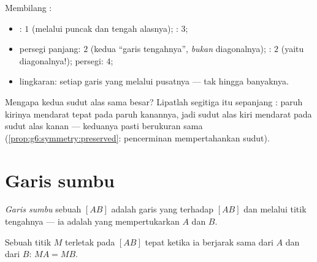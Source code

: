 \begin{example}\label{ex:g6:symmetry:shapes}
Membilang :
\begin{itemize}
  \item {}: $1$ (melalui  puncak dan
        tengah alasnya); : $3$;
  \item persegi panjang: $2$ (kedua ``garis tengahnya'', \emph{bukan}
        diagonalnya); : $2$ (yaitu diagonalnya!); persegi: $4$;
  \item lingkaran: setiap garis yang melalui pusatnya --- tak hingga banyaknya.
\end{itemize}
\end{example}

\begin{example}\label{ex:g6:symmetry:proves}
Mengapa kedua sudut alas  sama besar? Lipatlah
segitiga itu sepanjang : paruh kirinya mendarat tepat
pada paruh kanannya, jadi sudut alas kiri mendarat pada sudut alas
kanan --- keduanya pasti berukuran sama
(\cref{prop:g6:symmetry:preserved}: pencerminan mempertahankan sudut).
\end{example}

\section{Garis sumbu}

\begin{definition}\label{def:g6:symmetry:bisector}
\emph{Garis sumbu} sebuah  $[AB]$ adalah
garis yang  terhadap $[AB]$ dan melalui titik tengahnya ---
ia adalah  yang mempertukarkan $A$ dan $B$.
\end{definition}

\begin{proposition}\label{prop:g6:symmetry:bisector}
Sebuah titik $M$ terletak pada  $[AB]$ tepat ketika ia
berjarak sama dari $A$ dan dari $B$: $MA = MB$.
\end{proposition}
\admitted

